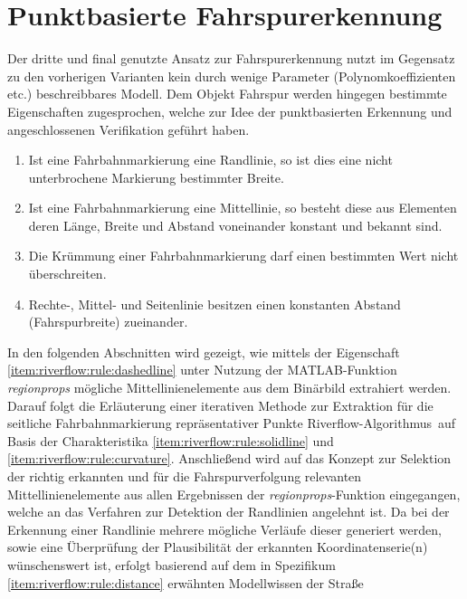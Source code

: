 \section{Punktbasierte Fahrspurerkennung \dcsecondauthorshort} 
\label{sec:fahrspurerkennung:riverflow}

Der dritte und final genutzte Ansatz zur Fahrspurerkennung nutzt im Gegensatz zu den vorherigen Varianten kein durch wenige Parameter (Polynomkoeffizienten etc.) beschreibbares Modell. Dem Objekt Fahrspur werden hingegen bestimmte Eigenschaften zugesprochen, welche zur Idee der punktbasierten Erkennung und angeschlossenen Verifikation geführt haben.
\begin{enumerate}
\item \label{item:riverflow:rule:solidline}
Ist eine Fahrbahnmarkierung eine Randlinie, so ist dies eine nicht unterbrochene Markierung bestimmter Breite.
\item \label{item:riverflow:rule:dashedline}
Ist eine Fahrbahnmarkierung eine Mittellinie, so besteht diese aus Elementen deren Länge, Breite und Abstand voneinander konstant und bekannt sind.
\item \label{item:riverflow:rule:curvature}
Die Krümmung einer Fahrbahnmarkierung darf einen bestimmten Wert nicht überschreiten.
\item \label{item:riverflow:rule:distance}
Rechte-, Mittel- und Seitenlinie besitzen einen konstanten Abstand (Fahrspurbreite) zueinander.
\end{enumerate}
In den folgenden Abschnitten wird gezeigt, wie mittels der Eigenschaft \ref{item:riverflow:rule:dashedline} unter Nutzung der MATLAB-Funktion \emph{regionprops} mögliche Mittellinienelemente aus dem Binärbild extrahiert werden. Darauf folgt die Erläuterung einer iterativen Methode zur Extraktion für die seitliche Fahrbahnmarkierung repräsentativer Punkte \glqq Riverflow-Algorithmus\grqq\ auf Basis der Charakteristika \ref{item:riverflow:rule:solidline} und \ref{item:riverflow:rule:curvature}. Anschließend wird auf das Konzept zur Selektion der richtig erkannten und für die Fahrspurverfolgung relevanten Mittellinienelemente aus allen Ergebnissen der \emph{regionprops}-Funktion eingegangen, welche an das Verfahren zur Detektion der Randlinien angelehnt ist. Da bei der Erkennung einer Randlinie mehrere mögliche Verläufe dieser generiert werden, sowie eine Überprüfung der Plausibilität der erkannten Koordinatenserie(n) wünschenswert ist, erfolgt basierend auf dem in Spezifikum \ref{item:riverflow:rule:distance} erwähnten Modellwissen der Straße 




